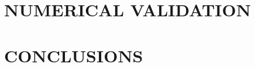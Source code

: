 \documentclass[dissertation]{uathesis}
\begin{document}
\begin{body}
\chapter{NUMERICAL VALIDATION}
\label{chap:num_vald}
 

\chapter{CONCLUSIONS}
\label{chap: conclusions}


\renewcommand{\bibname}{REFERENCES}
\begin{singlespace}


\label{bib}
\end{singlespace}

\appendix










\end{body}
\end{document}
